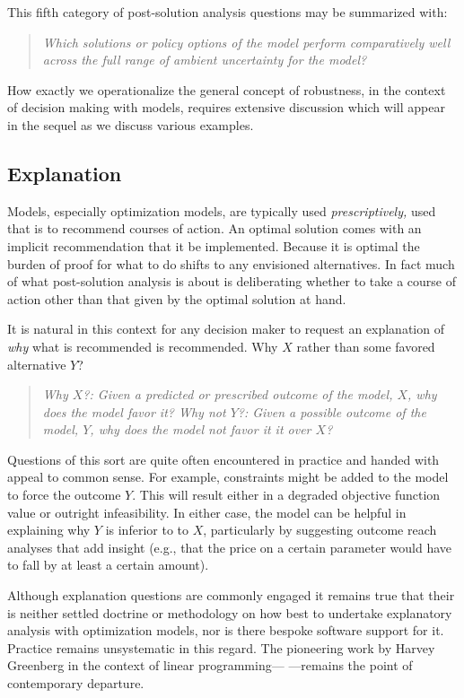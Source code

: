  This fifth category of post-solution analysis questions may be summarized with:
\begin{quote}
{\it Which solutions or policy options of the model perform comparatively well across the full range of ambient uncertainty for the model? }
\end{quote}
How exactly we operationalize the general concept of robustness, in the context of decision making with models, requires extensive discussion which will appear in the sequel as we discuss various examples.

\subsection{Explanation}

Models, especially optimization models, are typically used \emph{prescriptively,} used that is to recommend courses of action. An optimal solution comes with an implicit recommendation that it be implemented. Because it is optimal the burden of proof for what to do shifts to any envisioned alternatives. In fact much of what post-solution analysis is about is deliberating whether to take a course of action other than that given by the optimal solution at hand.

It is natural in this context for any decision maker to request an explanation of \emph{why} what is recommended is recommended.  Why $X$ rather than some favored alternative $Y$?

\begin{quote}
{\it Why $X$?: Given a predicted or prescribed outcome of the model, $X$, why does the model favor it?  Why not $Y$?: Given a possible outcome of the model, $Y$, why does the model not favor it it over $X$?}
\end{quote}
Questions of this sort are quite often encountered in practice and handed with appeal to common sense.  For example, constraints might be added to the model to force the outcome $Y$. This will result either in a degraded objective function value or outright infeasibility. In either case, the model can be helpful in explaining why $Y$ is inferior to to $X$, particularly by suggesting outcome reach analyses that add insight (e.g., that the price on a certain parameter would have to fall by at least a certain amount).

Although explanation questions are commonly engaged it remains true that their is neither settled doctrine or methodology on how best to undertake explanatory analysis with optimization models, nor is there bespoke software support for it. Practice remains unsystematic in this regard.
The pioneering work by Harvey Greenberg in the context of linear programming---
\cite{greenberg_1993_JulyAugust,greenberg_1993_SeptOct,greenberg_1993_NovDec,greenberg_1994_JanFeb}---remains the point of contemporary departure.

